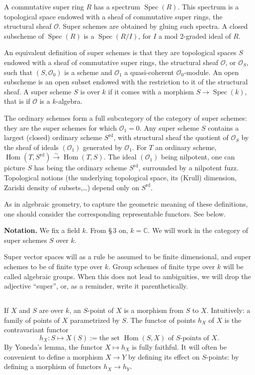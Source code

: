 \documentclass[11pt,a4paper]{article}
\theoremstyle{plain}
\theoremstyle{definition}
\DeclareMathOperator{\Hom}{Hom}
\DeclareMathOperator{\Spec}{Spec}
\newcommand{\simto}{\xrightarrow{\sim}}
\newcommand{\C}{\mathbb{C}}
\begin{document}
A commutative super ring $R$ has a spectrum $\Spec(R)$. This spectrum is a topological space endowed with a sheaf of commutative super rings, the structural sheaf $\mathcal{O}$. Super schemes are obtained by gluing such spectra. A closed subscheme of $\Spec(R)$ is a $\Spec(R/I)$, for $I$ a mod 2-graded ideal of $R$.

An equivalent definition of super schemes is that they are topological spaces $S$ endowed with a sheaf of commutative super rings, the structural sheaf $\mathcal{O}$, or $\mathcal{O}_S$, such that $(S, \mathcal{O}_0)$ is a scheme and $\mathcal{O}_1$ a quasi-coherent $\mathcal{O}_0$-module. An open subscheme is an open subset endowed with the restriction to it of the structural sheaf. A super scheme $S$ is over $k$ if it comes with a morphism $S \to \Spec(k)$, that is if $\mathcal{O}$ is a $k$-algebra.

The ordinary schemes form a full subcategory of the category of super schemes: they are the super schemes for which $\mathcal{O}_1 = 0$. Any super scheme $S$ contains a largest (closed) ordinary scheme $S^{\mathrm{rd}}$, with structural sheaf the quotient of $\mathcal{O}_S$ by the sheaf of ideals $(\mathcal{O}_1)$ generated by $\mathcal{O}_1$. For $T$ an ordinary scheme, $\Hom(T, S^{\mathrm{rd}}) \simto \Hom(T, S)$. The ideal $(\mathcal{O}_1)$ being nilpotent, one can picture $S$ has being the ordinary scheme $S^{\mathrm{rd}}$, surrounded by a nilpotent fuzz. Topological notions (the underlying topological space, its (Krull) dimension, Zariski density of subsets,\dots) depend only on $S^{\mathrm{rd}}$.

As in algebraic geometry, to capture the geometric meaning of these definitions, one should consider the corresponding representable functors. See below.

\smallskip
\noindent\textbf{Notation.} We fix a field $k$. From \S\,3 on, $k = \C$. We will work in the category of super schemes $S$ over $k$.

Super vector spaces will as a rule be assumed to be finite dimensional, and super schemes to be of finite type over $k$. Group schemes of finite type over $k$ will be called algebraic groups. When this does not lead to ambiguities, we will drop the adjective ``super'', or, as a reminder, write it parenthetically.

\subsection{}
If $X$ and $S$ are over $k$, an $S$-point of $X$ is a morphism from $S$ to $X$. Intuitively: a family of points of $X$ parametrized by $S$. The functor of points $h_X$ of $X$ is the contravariant functor
\[
h_X : S \mapsto X(S) := \text{the set } \Hom(S, X) \text{ of } S\text{-points of } X.
\]
By Yoneda's lemma, the functor $X \mapsto h_X$ is fully faithful. It will often be convenient to define a morphism $X \to Y$ by defining its effect on $S$-points: by defining a morphism of functors $h_X \to h_Y$.
\end{document}
